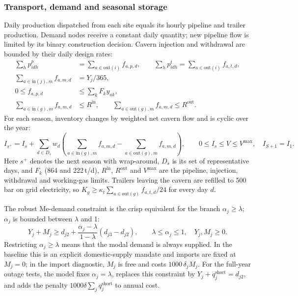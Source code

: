 \documentclass[11pt,a4paper]{article}
\begin{document}
\subsubsection{Transport, demand and seasonal storage}
Daily production dispatched from each site equals its hourly pipeline and
trailer production. Demand nodes receive a constant daily quantity; new
pipeline flow is limited by its binary construction decision. Cavern injection
and withdrawal are bounded by their daily design rates:
\begin{equation}
\begin{aligned}
\sum_h p^p_{idh}&=\sum_{a\in\mathrm{out}(i)}f_{a,p,d},\qquad
\sum_h p^t_{idh}=\sum_{a\in\mathrm{out}(i)}f_{a,t,d},\\
\sum_{a\in\mathrm{in}(j),m}f_{a,m,d}&=Y_j/365,\\
0\le f_{a,p,d}&\le \textstyle\sum_k F_k y_{ak},\\
\sum_{a\in\mathrm{in}(g),m}f_{a,m,d}&\le R^{\mathrm{in}},\qquad
\sum_{a\in\mathrm{out}(g),m}f_{a,m,d}\le R^{\mathrm{out}}.
\end{aligned}
\label{eq:s5_flow}
\end{equation}
For each season, inventory changes by weighted net cavern flow and is cyclic
over the year:
\begin{equation}
I_{s^+}=I_s+\sum_{d\in D_s}w_d\left(
\sum_{a\in\mathrm{in}(g),m}f_{a,m,d}-
\sum_{a\in\mathrm{out}(g),m}f_{a,m,d}\right),\qquad
0\le I_s\le V\le V^{\max},\quad I_{S+1}=I_1.
\label{eq:s5_inventory}
\end{equation}
Here $s^+$ denotes the next season with wrap-around, $D_s$ is its set of
representative days, and $F_k$ (864 and 222\,t/d), $R^{\mathrm{in}}$, $R^{\mathrm{out}}$ and
$V^{\max}$ are the pipeline, injection, withdrawal and working-gas limits. Trailers leaving the
cavern are refilled to 500\,bar on grid electricity, so
$K_g\ge\kappa_t\sum_{a\in\mathrm{out}(g)}f_{a,t,d}/24$ for every day $d$.

The robust Me-demand constraint is the crisp equivalent for the branch
$\alpha_j\ge\lambda$; $\alpha_j$ is bounded between $\lambda$ and 1:
\begin{equation}
Y_j+M_j\ge d_{j2}+\frac{\alpha_j-\lambda}{1-\lambda}
(d_{j3}-d_{j2}),\qquad \lambda\le\alpha_j\le1,\quad Y_j,M_j\ge0.
\label{eq:s5_demand}
\end{equation}
Restricting $\alpha_j\ge\lambda$ means that the modal demand is always supplied. In the baseline this
is an explicit domestic-supply mandate and imports are fixed at $M_j=0$; in the import diagnostic,
$M_j$ is free and costs $1000\,\delta_j M_j$.
For the full-year outage tests, the model fixes $\alpha_j=\lambda$, replaces
this constraint by $Y_j+q_j^{\mathrm{short}}=d_{j2}$, and adds the penalty
$1000\delta\sum_j q_j^{\mathrm{short}}$ to annual cost.
\end{document}

